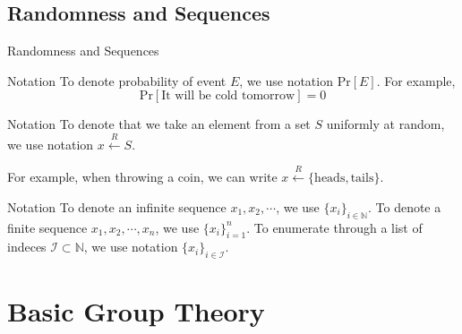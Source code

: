 \documentclass{beamer}
\begin{document}
    \subsection{Randomness and Sequences}

    \begin{frame}{Randomness and Sequences}
        \begin{block}{Notation}
          To denote probability of event $E$, we use notation $\text{Pr}[E]$. For example,
          \begin{equation*}
              \text{Pr}[\text{It will be cold tomorrow}] = 0
          \end{equation*}
        \end{block}

        \begin{block}{Notation}
            To denote that we take an element from a set $S$ uniformly at random, we use notation $x \xleftarrow{R} S$.

            For example, when throwing a coin, we can write $x \xleftarrow{R} \{\text{heads}, \text{tails}\}$.
        \end{block}

        \begin{block}{Notation}
          To denote an infinite sequence $x_1,x_2,\cdots$, we use $\{x_i\}_{i \in \mathbb{N}}$. To denote
          a finite sequence $x_1,x_2,\cdots,x_n$, we use $\{x_i\}_{i=1}^n$. To enumerate 
          through a list of indeces $\mathcal{I} \subset \mathbb{N}$, we use notation
          $\{x_i\}_{i \in \mathcal{I}}$.
        \end{block}
    \end{frame}

    \section{Basic Group Theory}
\end{document}
